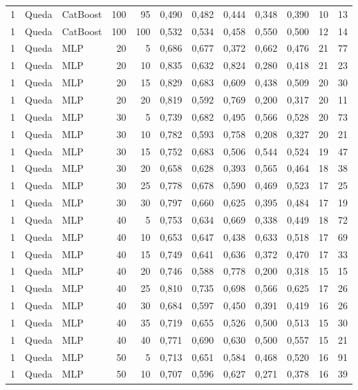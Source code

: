 \begin{longtable}{@{}rllrrrrrrrrr@{}}
1 & Queda & CatBoost & 100 & 95 & 0,490 & 0,482 & 0,444 & 0,348 & 0,390 & 10 & 13 \\
1 & Queda & CatBoost & 100 & 100 & 0,532 & 0,534 & 0,458 & 0,550 & 0,500 & 12 & 14 \\
1 & Queda & MLP & 20 & 5 & 0,686 & 0,677 & 0,372 & 0,662 & 0,476 & 21 & 77 \\
1 & Queda & MLP & 20 & 10 & 0,835 & 0,632 & 0,824 & 0,280 & 0,418 & 21 & 23 \\
1 & Queda & MLP & 20 & 15 & 0,829 & 0,683 & 0,609 & 0,438 & 0,509 & 20 & 30 \\
1 & Queda & MLP & 20 & 20 & 0,819 & 0,592 & 0,769 & 0,200 & 0,317 & 20 & 11 \\
1 & Queda & MLP & 30 & 5 & 0,739 & 0,682 & 0,495 & 0,566 & 0,528 & 20 & 73 \\
1 & Queda & MLP & 30 & 10 & 0,782 & 0,593 & 0,758 & 0,208 & 0,327 & 20 & 21 \\
1 & Queda & MLP & 30 & 15 & 0,752 & 0,683 & 0,506 & 0,544 & 0,524 & 19 & 47 \\
1 & Queda & MLP & 30 & 20 & 0,658 & 0,628 & 0,393 & 0,565 & 0,464 & 18 & 38 \\
1 & Queda & MLP & 30 & 25 & 0,778 & 0,678 & 0,590 & 0,469 & 0,523 & 17 & 25 \\
1 & Queda & MLP & 30 & 30 & 0,797 & 0,660 & 0,625 & 0,395 & 0,484 & 17 & 19 \\
1 & Queda & MLP & 40 & 5 & 0,753 & 0,634 & 0,669 & 0,338 & 0,449 & 18 & 72 \\
1 & Queda & MLP & 40 & 10 & 0,653 & 0,647 & 0,438 & 0,633 & 0,518 & 17 & 69 \\
1 & Queda & MLP & 40 & 15 & 0,749 & 0,641 & 0,636 & 0,372 & 0,470 & 17 & 33 \\
1 & Queda & MLP & 40 & 20 & 0,746 & 0,588 & 0,778 & 0,200 & 0,318 & 15 & 15 \\
1 & Queda & MLP & 40 & 25 & 0,810 & 0,735 & 0,698 & 0,566 & 0,625 & 17 & 26 \\
1 & Queda & MLP & 40 & 30 & 0,684 & 0,597 & 0,450 & 0,391 & 0,419 & 16 & 26 \\
1 & Queda & MLP & 40 & 35 & 0,719 & 0,655 & 0,526 & 0,500 & 0,513 & 15 & 30 \\
1 & Queda & MLP & 40 & 40 & 0,771 & 0,690 & 0,630 & 0,500 & 0,557 & 15 & 21 \\
1 & Queda & MLP & 50 & 5 & 0,713 & 0,651 & 0,584 & 0,468 & 0,520 & 16 & 91 \\
1 & Queda & MLP & 50 & 10 & 0,707 & 0,596 & 0,627 & 0,271 & 0,378 & 16 & 39 \\

\end{longtable}
